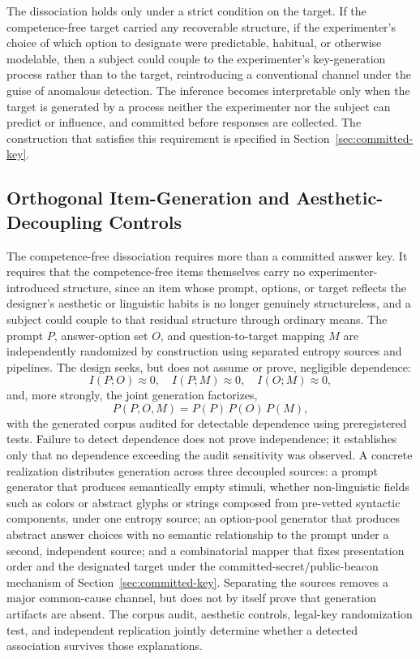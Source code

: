 \documentclass[11pt,letterpaper]{article}
\begin{document}
The dissociation holds only under a strict condition on the target. If the competence-free target carried any recoverable structure, if the experimenter's choice of which option to designate were predictable, habitual, or otherwise modelable, then a subject could couple to the experimenter's key-generation process rather than to the target, reintroducing a conventional channel under the guise of anomalous detection. The inference becomes interpretable only when the target is generated by a process neither the experimenter nor the subject can predict or influence, and committed before responses are collected. The construction that satisfies this requirement is specified in Section~\ref{sec:committed-key}.

\subsection{Orthogonal Item-Generation and Aesthetic-Decoupling Controls}
\label{sec:orthogonal}

The competence-free dissociation requires more than a committed answer key. It requires that the competence-free items themselves carry no experimenter-introduced structure, since an item whose prompt, options, or target reflects the designer's aesthetic or linguistic habits is no longer genuinely structureless, and a subject could couple to that residual structure through ordinary means. The prompt $P$, answer-option set $O$, and question-to-target mapping $M$ are independently randomized by construction using separated entropy sources and pipelines. The design seeks, but does not assume or prove, negligible dependence:
\begin{equation}
I(P;O) \approx 0,\quad I(P;M) \approx 0,\quad I(O;M) \approx 0,
\label{eq:orthog}
\end{equation}
and, more strongly, the joint generation factorizes,
\begin{equation}
P(P,O,M) = P(P)\,P(O)\,P(M),
\label{eq:factorize}
\end{equation}
with the generated corpus audited for detectable dependence using preregistered tests. Failure to detect dependence does not prove independence; it establishes only that no dependence exceeding the audit sensitivity was observed. A concrete realization distributes generation across three decoupled sources: a prompt generator that produces semantically empty stimuli, whether non-linguistic fields such as colors or abstract glyphs or strings composed from pre-vetted syntactic components, under one entropy source; an option-pool generator that produces abstract answer choices with no semantic relationship to the prompt under a second, independent source; and a combinatorial mapper that fixes presentation order and the designated target under the committed-secret/public-beacon mechanism of Section~\ref{sec:committed-key}. Separating the sources removes a major common-cause channel, but does not by itself prove that generation artifacts are absent. The corpus audit, aesthetic controls, legal-key randomization test, and independent replication jointly determine whether a detected association survives those explanations.
\end{document}
